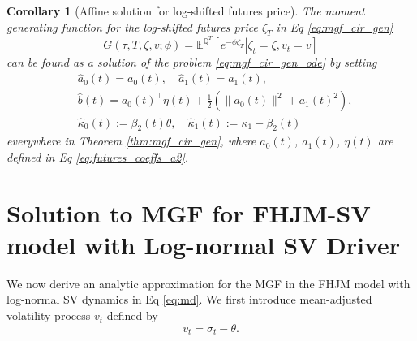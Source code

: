 \documentclass[pdftex,11pt,a4paper] {article}
\newtheorem{corollary}{Corollary}[section]
\begin{document}
\begin{corollary}[Affine solution for log-shifted futures price] The moment generating function for the log-shifted futures price $\zeta_T$  in Eq \eqref{eq:mgf_cir_gen} 
\begin{equation} \label{eq:f_heston}
G(\tau,T,\zeta,v;\phi)=\mathbb{E}^{\mathbb{Q}^{T}}\left[\left.e^{-\phi \zeta_T}\right|\zeta_t=\zeta,v_t=v\right]
\end{equation}
can be found as a solution of the problem \eqref{eq:mgf_cir_gen_ode} by setting
\begin{equation*}
\begin{split}
&\hat a_0(t)=a_0(t),\quad \hat a_1(t)=a_1(t),\\
&\hat b(t)=a_0(t)^\top\eta(t)+\frac{1}{2}\left(\|a_0(t)\|^2+a_1(t)^2\right),\\
&\hat\kappa_0(t):=\beta_2(t)\theta, \quad \hat\kappa_1(t):=\kappa_1-\beta_2(t)
\end{split}
\end{equation*}
everywhere in Theorem \ref{thm:mgf_cir_gen}, where $a_0(t)$, $a_1(t)$, $\eta(t)$ are defined in Eq \eqref{eq:futures_coeffs_a2}.
\end{corollary}



\section{Solution to MGF for FHJM-SV model with Log-normal SV Driver}\label{sec::affine_expansion}

We now derive an analytic approximation for the MGF in the FHJM model with log-normal SV dynamics in Eq \eqref{eq:md}. We first introduce mean-adjusted volatility process $v_t$ defined by
\begin{equation*}
v_t=\sigma_t-\theta.
\end{equation*}
\end{document}
